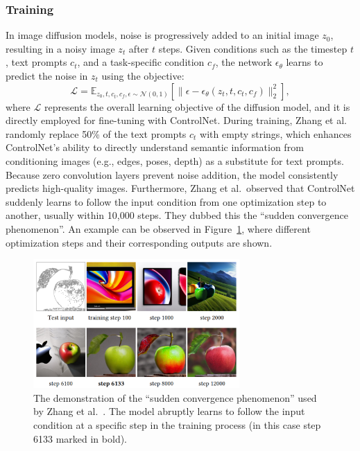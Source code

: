 \subsubsection{Training}
In image diffusion models, noise is progressively added to an initial image $z_0$, resulting in a noisy image $z_t$ after $t$ steps. Given conditions such as the timestep $t$, text prompts $c_t$, and a task-specific condition $c_f$, the network $\epsilon_\theta$ learns to predict the noise in $z_t$ using the objective:
\[
    \mathcal{L} = \mathbb{E}_{z_0, t, c_t, c_f, \epsilon \sim \mathcal{N}(0, 1)} \left[ \| \epsilon - \epsilon_\theta(z_t, t, c_t, c_f) \|_2^2 \right],
\]
where $\mathcal{L}$ represents the overall learning objective of the diffusion model, and it is directly employed for fine-tuning with ControlNet. During training, Zhang et al.~\cite{zhang2023addingconditionalcontroltexttoimage} randomly replace 50\% of the text prompts $c_t$ with empty strings, which enhances ControlNet's ability to directly understand semantic information from conditioning images (e.g., edges, poses, depth) as a substitute for text prompts. Because zero convolution layers prevent noise addition, the model consistently predicts high-quality images. Furthermore, Zhang et al.\ observed that ControlNet suddenly learns to follow the input condition from one optimization step to another, usually within 10,000 steps. They dubbed this the ``sudden convergence phenomenon''. An example can be observed in Figure~\ref{fig:control_net:training_steps}, where different optimization steps and their corresponding outputs are shown.
\begin{figure}[h!]
    \centering
    \includegraphics[width=0.7\textwidth]{assets/control_net_training_steps.pdf}
    \caption{The demonstration of the ``sudden convergence phenomenon'' used by Zhang et al.~\cite{zhang2023addingconditionalcontroltexttoimage}. The model abruptly learns to follow the input condition at a specific step in the training process (in this case step 6133 marked in bold).}
    \label{fig:control_net:training_steps}
\end{figure}
